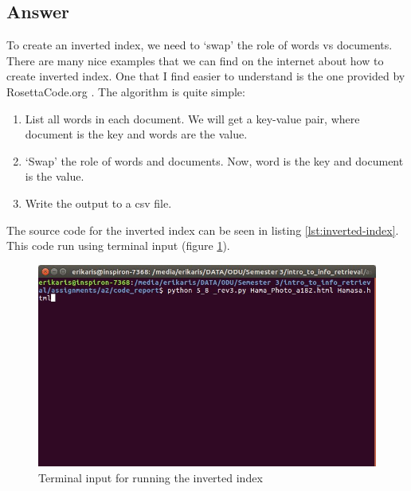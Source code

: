 \documentclass[letterpaper,11pt]{article}
\begin{document}
\subsection*{Answer}
To create an inverted index, we need to `swap' the role of words vs documents. There are many nice examples that we can find on the internet about how to create inverted index. One that I find easier to understand is the one provided by RosettaCode.org \cite{rosetta}. The algorithm is quite simple:
\begin{enumerate}
\item List all words in each document. We will get a key-value pair, where document is the key and words are the value. 
\item `Swap' the role of words and documents. Now, word is the key and document is the value. 
\item Write the output to a csv file. 
\end{enumerate}

The source code for the inverted index can be seen in listing \ref{lst:inverted-index}. This code run using terminal input (figure \ref{fig:5_8_terminal_input}). 

\begin{figure}[H]
	\includegraphics[scale=0.6]{5_8_terminal_input}
	\caption{Terminal input for running the inverted index}
	\label{fig:5_8_terminal_input}
\end{figure}
\end{document}

